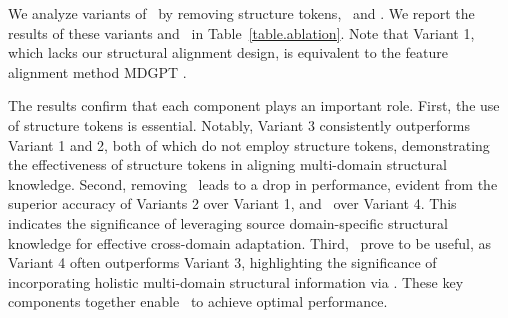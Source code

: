 We analyze variants of \model\ by removing structure tokens, \op\ and \cp. We report the results of these variants and \model\ in Table~\ref{table.ablation}. 
Note that Variant 1, which lacks our structural alignment design, is equivalent to the feature alignment method MDGPT \cite{yu2024text}.

The results confirm that each component plays an important role.
First, the use of structure tokens is essential. Notably, Variant 3 consistently outperforms Variant 1 and 2, both of which do not employ structure tokens, demonstrating the effectiveness of structure tokens in aligning multi-domain structural knowledge.
Second, removing \cp\ leads to a drop in performance, evident from the superior accuracy of Variants 2 over Variant 1, and \model\ over Variant 4. This indicates the significance of leveraging source domain-specific structural knowledge for effective cross-domain adaptation. 
Third, \op\ prove to be useful, as Variant 4 often outperforms Variant 3, highlighting the significance of incorporating holistic multi-domain structural information via \op.
These key components together enable \model\ to achieve optimal performance. 


 

 
 
